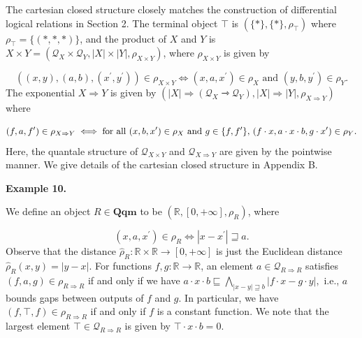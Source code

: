 \documentclass[10pt,a4paper]{amsart}
\begin{document}

 
The cartesian closed structure closely matches the construction of differential logical relations in Section 2. The terminal object $\top$ is $(\{\ast\},\{\ast\},\rho_{\top})$ where $\rho_{\top}=\{(\ast,\ast,\ast)\}$, and the product of $X$ and $Y$ is $X\times Y=(\mathcal{Q}_{X}\times\mathcal{Q}_{Y},|X|\times|Y|,\rho_{X\times Y})$, where $\rho_{X\times Y}$ is given by\par
    \[((x,y),(a,b),(x^{\prime},y^{\prime}))\in\rho_{X\times Y}\iff(x,a,x^{\prime})%
\in\rho_{X}\text{ and }(y,b,y^{\prime})\in\rho_{Y}.\]    
The exponential $X\Rightarrow Y$ is given by $(|X|\Rightarrow(\mathcal{Q}_{X}\rightarrowtriangle\mathcal{Q}_{Y}),|X|%
\Rightarrow|Y|,\rho_{X\Rightarrow Y})$ where\par
    \[(f,a,f^{\prime})\in\rho_{X\Rightarrow Y}\iff\text{for all }(x,b,x^{\prime})\in%
\rho_{X}\text{ and }g\in\{f,f^{\prime}\},\,(f\cdot x,a\cdot x\cdot b,g\cdot x^%
{\prime})\in\rho_{Y}.\]    
Here, the quantale structure of $\mathcal{Q}_{X\times Y}$ and $\mathcal{Q}_{X\Rightarrow Y}$ are given by the pointwise manner. We give details of the cartesian closed structure in Appendix B.\par
 
 
 
\par\medskip\noindent\textbf{Example 10.}\par
 
 
We define an object $R\in\mathbf{Qqm}$ to be $(\mathbb{R},[0,+\infty],\rho_{R})$, where\par
    \[(x,a,x^{\prime})\in\rho_{R}\iff|x-x^{\prime}|\sqsupseteq a.\]    
Observe that the distance $\widehat{\rho}_{R}:\mathbb{R}\times\mathbb{R}\to[0,+\infty]$ is just the Euclidean distance $\widehat{\rho}_{R}(x,y)=|y-x|$. For functions $f,g\colon\mathbb{R}\to\mathbb{R}$, an element $a\in\mathcal{Q}_{R\Rightarrow R}$ satisfies $(f,a,g)\in\rho_{R\Rightarrow R}$ if and only if we have $a\cdot x\cdot b\sqsubseteq\bigwedge_{|x-y|\sqsupseteq b}|f\cdot x-g\cdot y|,$ i.e., $a$ bounds gaps between outputs of $f$ and $g$. In particular, we have $(f,\top,f)\in\rho_{R\Rightarrow R}$ if and only if $f$ is a constant function. We note that the largest element $\top\in\mathcal{Q}_{R\Rightarrow R}$ is given by $\top\cdot x\cdot b=0$.\par
 
\end{document}
